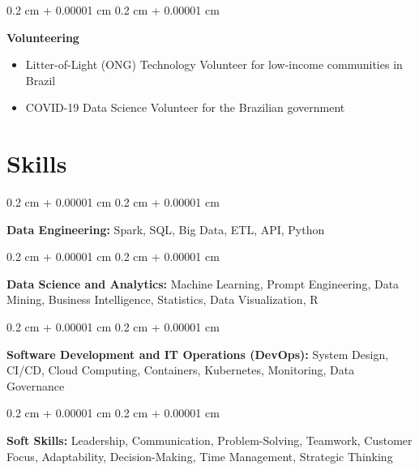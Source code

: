 \documentclass[10pt, letterpaper]{article}
\newenvironment{highlights}{
    \begin{itemize}[
        topsep=0.10 cm,
        parsep=0.10 cm,
        partopsep=0pt,
        itemsep=0pt,
        leftmargin=0.4 cm + 10pt
    ]
}{
    \end{itemize}
} %
\newenvironment{onecolentry}{
    \begin{adjustwidth}{
        0.2 cm + 0.00001 cm
    }{
        0.2 cm + 0.00001 cm
    }
}{
    \end{adjustwidth}
} %
\begin{document}
        \vspace{0.2 cm}

        \begin{onecolentry}
            \textbf{Volunteering}
            \begin{highlights}
                \item Litter-of-Light (ONG) Technology Volunteer for low-income communities in Brazil
                \item COVID-19 Data Science Volunteer for the Brazilian government
            \end{highlights}
        \end{onecolentry}



    
    \section{Skills}



        
        \begin{onecolentry}
            \textbf{Data Engineering:} Spark, SQL, Big Data, ETL, API, Python
        \end{onecolentry}

        \vspace{0.2 cm}

        \begin{onecolentry}
            \textbf{Data Science and Analytics:} Machine Learning, Prompt Engineering, Data Mining, Business Intelligence, Statistics, Data Visualization, R
        \end{onecolentry}

        \vspace{0.2 cm}

        \begin{onecolentry}
            \textbf{Software Development and IT Operations (DevOps):} System Design, CI/CD, Cloud Computing, Containers, Kubernetes, Monitoring, Data Governance
        \end{onecolentry}

        \vspace{0.2 cm}

        \begin{onecolentry}
            \textbf{Soft Skills:} Leadership, Communication, Problem-Solving, Teamwork, Customer Focus, Adaptability, Decision-Making, Time Management, Strategic Thinking
        \end{onecolentry}


    
\end{document}
